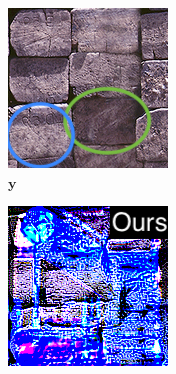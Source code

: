 \begin{figure}[]
\begin{subfigure}{\textwidth}
        \begin{subfigure}{0.19\textwidth}
            \centering
            \includegraphics[width=\textwidth]{images/04-experiment03/staircase_beams_target_highlighted.jpg}
            \caption{\(\bm{y}\)}
            \label{fig:ex03-staircase_illum-beams-target}
        \end{subfigure}
        \hfill
        \begin{subfigure}{0.19\textwidth}
            \centering
            \includegraphics[width=\textwidth]{images/04-experiment03/staircase_illum/beams/stats_im_label.jpg}

\end{subfigure}
\end{subfigure}
\end{figure}
